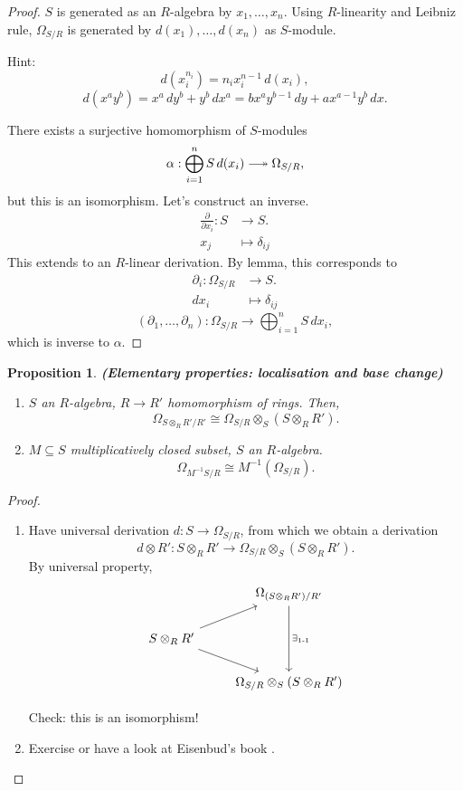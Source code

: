 \documentclass[12pt]{article}
\newtheorem*{proposition}{Proposition}
\theoremstyle{definition}
\begin{document}
\begin{proof}
$S$ is generated as an $R$-algebra by $x_1,\ldots,x_n$. Using $R$-linearity and Leibniz rule, $\Omega_{S/R}$ is generated by $d(x_1),\ldots,d(x_n)$ as $S$-module.

Hint:
\[d(x_i^{n_i})=n_ix_i^{n-1}\,d(x_i),\]
\[d(x^ay^b)=x^a\,dy^b+y^b\,dx^a=bx^ay^{b-1}\,dy+ax^{a-1}y^b\,dx.\]

There exists a surjective homomorphism of $S$-modules
\[\alpha:\bigoplus_{i=1}^nS\,d(x_i)\relbar\joinrel\twoheadrightarrow\Omega_{S/R},\]
but this is an isomorphism. Let's construct an inverse.
\begin{align*}
\frac{\partial}{\partial x_i}:S&\longrightarrow S.\\
x_j&\longmapsto\delta_{ij}
\end{align*}
This extends to an $R$-linear derivation. By lemma, this corresponds to
\begin{align*}
\partial_i:\Omega_{S/R}&\longrightarrow S.\\
dx_i&\longmapsto\delta_{ij}
\end{align*}
\[(\partial_1,\ldots,\partial_n):\Omega_{S/R}\longrightarrow\bigoplus_{i=1}^nS\,dx_i,\]
which is inverse to $\alpha$.
\end{proof}

\begin{proposition}
\emph{\textbf{(Elementary properties: localisation and base change)}}
\begin{enumerate}[label=\arabic*)]
\item $S$ an $R$-algebra, $R\rightarrow R'$ homomorphism of rings. Then,
\[\Omega_{S\otimes_RR'/R'}\cong\Omega_{S/R}\otimes_S(S\otimes_RR').\]

\item $M\subseteq S$ multiplicatively closed subset, $S$ an $R$-algebra.
\[\Omega_{M^{-1}S/R}\cong M^{-1}(\Omega_{S/R}).\]
\end{enumerate}
\end{proposition}

\begin{proof}
\begin{enumerate}[label=\arabic*)]
\item Have universal derivation $d:S\rightarrow\Omega_{S/R}$, from which we obtain a derivation
\[d\otimes R':S\otimes_RR'\longrightarrow\Omega_{S/R}\otimes_S(S\otimes_RR').\]
By universal property,
\[
\begin{tikzcd}
&\Omega_{(S\otimes_RR')/R'}\arrow[dd,"\exists_{1\text{-}1}"]\\
S\otimes_RR'\arrow[ru]\arrow[rd]\\
&\Omega_{S/R}\otimes_S(S\otimes_RR')
\end{tikzcd}
\]

Check: this is an isomorphism!

\item Exercise or have a look at Eisenbud's book \cite{eisenbud2013commutative}.
\end{enumerate}
\end{proof}
\end{document}
